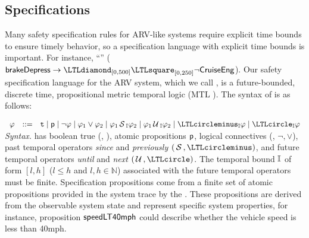 \subsection{Specifications}
Many safety specification rules for ARV-like systems require explicit time bounds to ensure timely behavior, so a specification language with explicit time bounds is important. 
For instance, 
``'' 
($\pred{brakeDepress} \rightarrow \eventually_{[0, 500]} \henceforth_{[0,250]} \neg \pred{CruiseEng}$). 
Our safety specification language for the ARV system, which we call \planguage, is a future-bounded, discrete time, propositional metric temporal logic (MTL \cite{Koymans1990}). 
The syntax of \planguage is as follows:

\(
\begin{array}{ccc}
\policy & ::=  & \true \mid \pred{p} \mid \neg \policy \mid \policy_1\vee \policy_2\mid
\policy_1\since_{\interval}\policy_2 \mid \policy_1\until_{\interval}\policy_2\mid\yesterday_{\interval}\policy\mid \tomorrow_{\interval}\policy
\end{array}
\) \\
\textit{Syntax.}
\planguage has boolean true (\ie, \true), 
atomic propositions $\mathsf{p}$, logical connectives (\ie, $\neg, \vee$), 
past temporal operators \emph{since} and \emph{previously} $(\since, \yesterday)$,  and future temporal operators \emph{until} and \emph{next} $(\until, \tomorrow)$. 
The temporal bound $\mathbb{I}$ of form $[l,h]$ ($l\leq h$ and $l,h\in\mathbb{N}$) associated with the future temporal operators must be finite.
Specification propositions  come from a finite set of atomic propositions provided in the system trace by the \sfmap. 
These propositions are derived from the observable system state and represent specific system properties, for instance, 
proposition $\mathsf{speedLT40mph}$ could describe whether the vehicle speed is less than 40mph.
%


